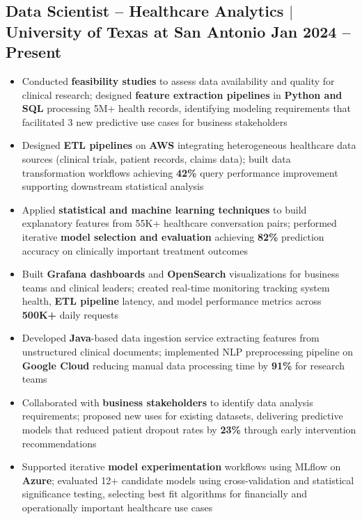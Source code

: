 \documentclass[10pt,letterpaper]{article}
\begin{document}
\subsection{Data Scientist -- Healthcare Analytics $|$ University of Texas at San Antonio \hfill Jan 2024 -- Present}
{\small
\begin{itemize}
    \item Conducted \textbf{feasibility studies} to assess data availability and quality for clinical research; designed \textbf{feature extraction pipelines} in \textbf{Python and SQL} processing 5M+ health records, identifying modeling requirements that facilitated 3 new predictive use cases for business stakeholders
    \item Designed \textbf{ETL pipelines} on \textbf{AWS} integrating heterogeneous healthcare data sources (clinical trials, patient records, claims data); built data transformation workflows achieving \textbf{42\%} query performance improvement supporting downstream statistical analysis
    \item Applied \textbf{statistical and machine learning techniques} to build explanatory features from 55K+ healthcare conversation pairs; performed iterative \textbf{model selection and evaluation} achieving \textbf{82\%} prediction accuracy on clinically important treatment outcomes
    \item Built \textbf{Grafana dashboards} and \textbf{OpenSearch} visualizations for business teams and clinical leaders; created real-time monitoring tracking system health, \textbf{ETL pipeline} latency, and model performance metrics across \textbf{500K+} daily requests
    \item Developed \textbf{Java}-based data ingestion service extracting features from unstructured clinical documents; implemented NLP preprocessing pipeline on \textbf{Google Cloud} reducing manual data processing time by \textbf{91\%} for research teams
    \item Collaborated with \textbf{business stakeholders} to identify data analysis requirements; proposed new uses for existing datasets, delivering predictive models that reduced patient dropout rates by \textbf{23\%} through early intervention recommendations
    \item Supported iterative \textbf{model experimentation} workflows using MLflow on \textbf{Azure}; evaluated 12+ candidate models using cross-validation and statistical significance testing, selecting best fit algorithms for financially and operationally important healthcare use cases
\end{itemize}}
\end{document}
